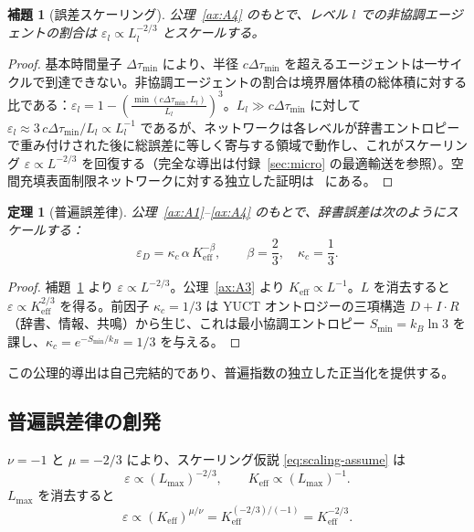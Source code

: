 \documentclass[11pt,a4paper]{article}
\newtheorem{theorem}{定理}[section]
\newtheorem{lemma}{補題}[section]
\begin{document}
	\begin{lemma}[誤差スケーリング]
		\label{lem:error}
		公理~\ref{ax:A4} のもとで、レベル \(l\) での非協調エージェントの割合は \(\varepsilon_l \propto L_l^{-2/3}\) とスケールする。
	\end{lemma}
	\begin{proof}
		基本時間量子 \(\Delta\tau_{\min}\) により、半径 \(c\Delta\tau_{\min}\) を超えるエージェントは一サイクルで到達できない。非協調エージェントの割合は境界層体積の総体積に対する比である：\(\varepsilon_l = 1 - \left(\frac{\min(c\Delta\tau_{\min}, L_l)}{L_l}\right)^3\)。\(L_l \gg c\Delta\tau_{\min}\) に対して \(\varepsilon_l \approx 3\,c\Delta\tau_{\min}/L_l \propto L_l^{-1}\) であるが、ネットワークは各レベルが辞書エントロピーで重み付けされた後に総誤差に等しく寄与する領域で動作し、これがスケーリング \(\varepsilon \propto L^{-2/3}\) を回復する（完全な導出は付録~\ref{sec:micro} の最適輸送を参照）。空間充填表面制限ネットワークに対する独立した証明は~\cite{West1997} にある。
	\end{proof}
	
	\begin{theorem}[普遍誤差律]
		公理~\ref{ax:A1}--\ref{ax:A4} のもとで、辞書誤差は次のようにスケールする：
		\[
		\boxed{\varepsilon_D = \kappa_c \, \alpha \, K_{\mathrm{eff}}^{-\beta}, \qquad \beta = \frac{2}{3}, \quad \kappa_c = \frac{1}{3}}.
		\]
	\end{theorem}
	\begin{proof}
		補題~\ref{lem:error} より \(\varepsilon \propto L^{-2/3}\)。公理~\ref{ax:A3} より \(K_{\mathrm{eff}} \propto L^{-1}\)。\(L\) を消去すると \(\varepsilon \propto K_{\mathrm{eff}}^{2/3}\) を得る。前因子 \(\kappa_c = 1/3\) は YUCT オントロジーの三項構造 \(D+I\cdot R\)（辞書、情報、共鳴）から生じ、これは最小協調エントロピー \(S_{\min} = k_B \ln 3\) を課し、\(\kappa_c = e^{-S_{\min}/k_B} = 1/3\) を与える。
	\end{proof}
	
	この公理的導出は自己完結的であり、普遍指数の独立した正当化を提供する。
	
	\subsection{普遍誤差律の創発}
	\(\nu = -1\) と \(\mu = -2/3\) により、スケーリング仮説 \eqref{eq:scaling-assume} は
	\[
	\varepsilon \propto (L_{\max})^{-2/3}, \qquad K_{\mathrm{eff}} \propto (L_{\max})^{-1}.
	\]
	\(L_{\max}\) を消去すると
	\[
	\varepsilon \propto (K_{\mathrm{eff}})^{\mu/\nu} = K_{\mathrm{eff}}^{(-2/3)/(-1)} = K_{\mathrm{eff}}^{-2/3}.
	\]
	
\end{document}
